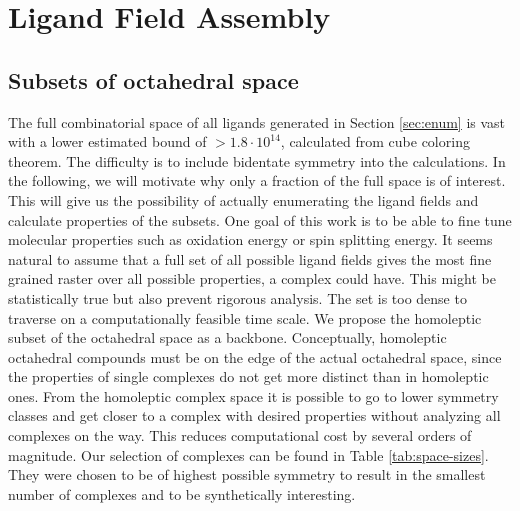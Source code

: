 \section{Ligand Field Assembly}

\subsection{Subsets of octahedral space}
The full combinatorial space of all ligands generated in Section \ref{sec:enum} is vast with a lower estimated bound of $> 1.8 \cdot 10^{14}$, calculated from cube coloring theorem. The difficulty is to include bidentate symmetry into the calculations. In the following, we will motivate why only a fraction of the full space is of interest. This will give us the possibility of actually enumerating the ligand fields and calculate properties of the subsets.
One goal of this work is to be able to fine tune molecular properties such as oxidation energy or spin splitting energy. It seems natural to assume that a full set of all possible ligand fields gives the most fine grained raster over all possible properties, a complex could have. This might be statistically true but also prevent rigorous analysis. The set is too dense to traverse on a computationally feasible time scale. We propose the homoleptic subset of the octahedral space as a backbone. Conceptually, homoleptic octahedral compounds must be on the edge of the actual octahedral space, since the properties of single complexes do not get more distinct than in homoleptic ones. From the homoleptic complex space it is possible to go to lower symmetry classes and get closer to a complex with desired properties without analyzing all complexes on the way. This reduces computational cost by several orders of magnitude. Our selection of complexes can be found in Table \ref{tab:space-sizes}. They were chosen to be of highest possible symmetry to result in the smallest number of complexes and to be synthetically interesting. 

